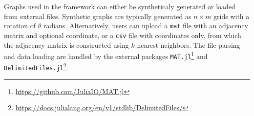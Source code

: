 \documentclass[../paper.tex]{subfiles}
\begin{document}
    Graphs used in the framework can either be syntheticaly generated or loaded from external files.
    Synthetic graphs are typically generated as $n \times m$ grids with a rotation of $\theta$ radians.
    Alternatively, users can upload a \texttt{mat} file with an adjacency matrix and optional coordinate, or a \texttt{csv} file with coordinates only, from which the adjacency matrix is constructed using $k$-nearest neighbors.
    The file parsing and data loading are handled by the external packages \texttt{MAT.jl}\footnote{\url{https://github.com/JuliaIO/MAT.jl}} and \texttt{DelimitedFiles.jl}\footnote{\url{https://docs.julialang.org/en/v1/stdlib/DelimitedFiles/}}.
    
\end{document}
